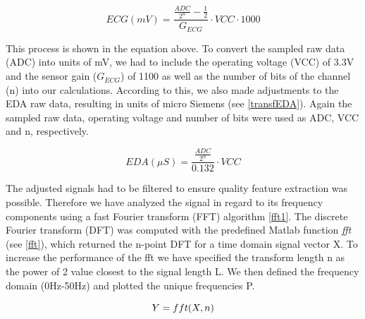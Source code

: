 \begin{equation}\label{transfECG}
ECG(mV) = \frac{\frac{ADC}{2^{n}}-\frac{1}{2}}{G_{ECG}} \cdot VCC \cdot 1000 
\end{equation}

This process is shown in the equation above. To convert the sampled raw data (ADC) into units of mV, we had to include the operating voltage (VCC) of 3.3V and the sensor gain ($G_{ECG}$) of 1100 as well as the number of bits of the channel (n) into our calculations. According to this, we also made adjustments to the EDA raw data, resulting in units of micro Siemens (see \ref{transfEDA}). Again the sampled raw data, operating voltage and number of bits were used as ADC, VCC and n, respectively. 
 
\begin{equation}\label{transfEDA}
EDA (\mu S) = \frac{\frac{ADC}{2^{n}}}{0.132} \cdot VCC
\end{equation}

%
%

The adjusted signals had to be filtered to ensure quality feature extraction was possible. Therefore we have analyzed the signal in regard to its frequency components using a fast Fourier transform (FFT) algorithm \ref{fft1}. The discrete Fourier transform (DFT) was computed with the predefined Matlab function \textit{fft} (see \ref{fft}), which returned the n-point DFT for a time domain signal vector X. To increase the performance of the fft we have specified the transform length n as the power of 2 value closest to the signal length L. We then defined the frequency domain (0Hz-50Hz) and plotted the unique frequencies P.

\begin{equation}\label{fft}
Y = fft(X,n) \\
\end{equation}

